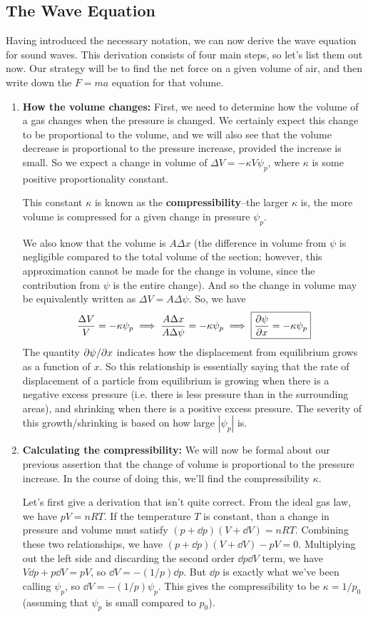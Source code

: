 \subsection*{The Wave Equation}
Having introduced the necessary notation, we can now derive the wave equation for sound waves. This derivation consists of four main steps, so let's list them out now. Our strategy will be to find the net force on a given volume of air, and then write down the $F=ma$ equation for that volume.
\begin{enumerate}
    \item \textbf{How the volume changes:} First, we need to determine how the volume of a gas changes when the pressure is changed. We certainly expect this change to be proportional to the volume, and we will also see that the volume decrease is proportional to the pressure increase, provided the increase is small. So we expect a change in volume of $\Delta V = -\kappa V\psi_p$, where $\kappa$ is some positive proportionality constant.

    This constant $\kappa$ is known as the \textbf{compressibility}--the larger $\kappa$ is, the more volume is compressed for a given change in pressure $\psi_p$. 

    We also know that the volume is $A\Delta x$ (the difference in volume from $\psi$ is negligible compared to the total volume of the section; however, this approximation cannot be made for the change in volume, since the contribution from $\psi$ is the entire change). And so the change in volume may be equivalently written as $\Delta V = A\Delta \psi$. So, we have 
    \[ \frac{\Delta V}{V} = -\kappa \psi_p \implies \frac{A\Delta x}{A\Delta \psi} = -\kappa \psi_p \implies \boxed{\pdv{\psi}{x} = -\kappa\psi_p}\]
    The quantity $\partial \psi/\partial x$ indicates how the displacement from equilibrium grows as a function of $x$. So this relationship is essentially saying that the rate of displacement of a particle from equilibrium is growing when there is a negative excess pressure (i.e. there is less pressure than in the surrounding areas), and shrinking when there is a positive excess pressure. The severity of this growth/shrinking is based on how large $|\psi_p|$ is.
    \item \textbf{Calculating the compressibility:} We will now be formal about our previous assertion that the change of volume is proportional to the pressure increase. In the course of doing this, we'll find the compressibility $\kappa$.

    Let's first give a derivation that isn't quite correct. From the ideal gas law, we have $pV = nRT$. If the temperature $T$ is constant, than a change in pressure and volume must satisfy $(p + \dd p)(V + \dd V) = nRT$. Combining these two relationships, we have $(p+\dd p)(V + \dd V) - pV = 0$. Multiplying out the left side and discarding the second order $\dd p\dd V$ term, we have $V\dd p + p \dd V = pV$, so $\dd V = -(1/p)\dd p$. But $\dd p$ is exactly what we've been calling $\psi_p$, so $\dd V = -(1/p)\psi_p$. This gives the compressibility to be $\kappa = 1/p_0$ (assuming that $\psi_p$ is small compared to $p_0$).


\end{enumerate}
